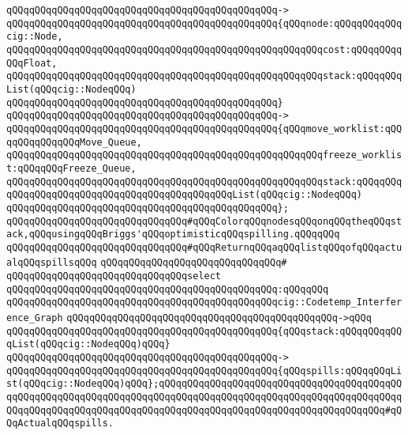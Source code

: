 \verb|qQQqqQQqqQQqqQQqqQQqqQQqqQQqqQQqqQQqqQQqqQQqqQQq->|\newline
\verb|qQQqqQQqqQQqqQQqqQQqqQQqqQQqqQQqqQQqqQQqqQQqqQQq{qQQqnode:qQQqqQQqqQQqcig::Node,|\newline
\verb|qQQqqQQqqQQqqQQqqQQqqQQqqQQqqQQqqQQqqQQqqQQqqQQqqQQqqQQqcost:qQQqqQQqqQQqFloat,|\newline
\verb|qQQqqQQqqQQqqQQqqQQqqQQqqQQqqQQqqQQqqQQqqQQqqQQqqQQqqQQqstack:qQQqqQQqList(qQQqcig::NodeqQQq)|\newline
\verb|qQQqqQQqqQQqqQQqqQQqqQQqqQQqqQQqqQQqqQQqqQQqqQQq}|\newline
\verb|qQQqqQQqqQQqqQQqqQQqqQQqqQQqqQQqqQQqqQQqqQQqqQQq->|\newline
\verb|qQQqqQQqqQQqqQQqqQQqqQQqqQQqqQQqqQQqqQQqqQQqqQQq{qQQqmove_worklist:qQQqqQQqqQQqqQQqMove_Queue,|\newline
\verb|qQQqqQQqqQQqqQQqqQQqqQQqqQQqqQQqqQQqqQQqqQQqqQQqqQQqqQQqfreeze_worklist:qQQqqQQqFreeze_Queue,|\newline
\verb|qQQqqQQqqQQqqQQqqQQqqQQqqQQqqQQqqQQqqQQqqQQqqQQqqQQqqQQqstack:qQQqqQQqqQQqqQQqqQQqqQQqqQQqqQQqqQQqqQQqqQQqqQQqList(qQQqcig::NodeqQQq)|\newline
\verb|qQQqqQQqqQQqqQQqqQQqqQQqqQQqqQQqqQQqqQQqqQQqqQQq};|\newline
\newline
\newline
\verb|qQQqqQQqqQQqqQQqqQQqqQQqqQQqqQQq#qQQqColorqQQqnodesqQQqonqQQqtheqQQqstack,qQQqusingqQQqBriggs'qQQqoptimisticqQQqspilling.qQQqqQQq|\newline
\verb|qQQqqQQqqQQqqQQqqQQqqQQqqQQqqQQq#qQQqReturnqQQqaqQQqlistqQQqofqQQqactualqQQqspillsqQQq|\newline
\verb|qQQqqQQqqQQqqQQqqQQqqQQqqQQqqQQq#|\newline
\verb|qQQqqQQqqQQqqQQqqQQqqQQqqQQqqQQqselect|\newline
\verb|qQQqqQQqqQQqqQQqqQQqqQQqqQQqqQQqqQQqqQQqqQQqqQQq:qQQqqQQq|\newline
\verb|qQQqqQQqqQQqqQQqqQQqqQQqqQQqqQQqqQQqqQQqqQQqqQQqcig::Codetemp_Interference_Graph|\newline
\verb|qQQqqQQqqQQqqQQqqQQqqQQqqQQqqQQqqQQqqQQqqQQqqQQq->qQQq|\newline
\verb|qQQqqQQqqQQqqQQqqQQqqQQqqQQqqQQqqQQqqQQqqQQqqQQq{qQQqstack:qQQqqQQqqQQqList(qQQqcig::NodeqQQq)qQQq}|\newline
\verb|qQQqqQQqqQQqqQQqqQQqqQQqqQQqqQQqqQQqqQQqqQQqqQQq->|\newline
\verb|qQQqqQQqqQQqqQQqqQQqqQQqqQQqqQQqqQQqqQQqqQQqqQQq{qQQqspills:qQQqqQQqList(qQQqcig::NodeqQQq)qQQq};qQQqqQQqqQQqqQQqqQQqqQQqqQQqqQQqqQQqqQQqqQQqqQQqqQQqqQQqqQQqqQQqqQQqqQQqqQQqqQQqqQQqqQQqqQQqqQQqqQQqqQQqqQQqqQQqqQQqqQQqqQQqqQQqqQQqqQQqqQQqqQQqqQQqqQQqqQQqqQQqqQQqqQQqqQQqqQQqqQQq#qQQqActualqQQqspills.|\newline
